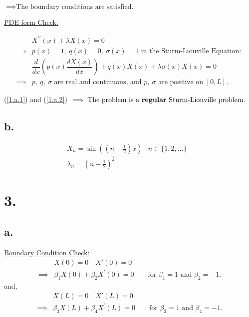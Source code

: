 \documentclass{article}
\begin{document}
\noindent
$\implies \text{The boundary conditions are satisfied.}$
\newline

\noindent
\underline{PDE form Check:}

\begin{align}
  &X^{\prime\prime}(x) + \lambda X(x) = 0 \nonumber \\
  \implies& p(x) = 1, \: q(x) = 0, \: \sigma(x) = 1 \text{ in the Sturm-Liouville Equation: } \nonumber \\
  &\dfrac{d}{dx} \left(p(x) \dfrac{dX(x)}{dx}\right) + q(x)X(x) + \lambda \sigma(x) X(x) = 0 \nonumber \\
  \implies& p, \: q, \: \sigma \text{ are real and continuous, and } 
  p, \: \sigma \text{ are positive on } [0, L]. \label{1.a.2}
\end{align}
\newline

\noindent
(\ref{1.a.1}) and (\ref{1.a.2}) $\implies \text{The problem is a \textbf{regular} Sturm-Liouville problem}.$

\subsection*{b.}
\begin{align*}
  &X_n = \sin((n-\frac{1}{2})x) & n \in \{1,2, \dots\} &&\\
  & \lambda_n = (n-\frac{1}{2})^2.
\end{align*}
\newpage

\section*{3.}
\subsection*{a.}
\noindent
\underline{Boundary Condition Check:}
\begin{align*}
  &X(0) = 0 \quad X'(0) = 0 \\
  \implies&  \beta_1 X(0) + \beta_2 X^{\prime}(0) = 0 \qquad \text{for } \beta_1 = 1 \text{ and } \beta_2 = -1.
\end{align*}
and,
\begin{align}
  &X(L) = 0 \quad X'(L) = 0 \nonumber \\
  \implies&  \beta_3 X(L) + \beta_4 X^{\prime}(L) = 0 \qquad \text{for } \beta_3 = 1 \text{ and } \beta_4 = -1. \label{3.a.1}
\end{align}
\end{document}

